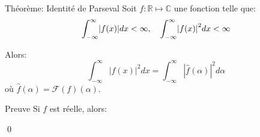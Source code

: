 \documentclass[a4paper]{article}
\begin{document}
\begin{parag}{Théorème: Identité de Parseval}
    Soit $f: \mathbb{R} \mapsto \mathbb{C}$ une fonction telle que: 
    \[\int_{-\infty}^{\infty} \left|f\left(x\right)\right|dx < \infty, \mathspace \int_{-\infty}^{\infty} \left|f\left(x\right)\right|^2 dx < \infty\]
    
    Alors: 
    \[\int_{-\infty}^{\infty} \left|f\left(x\right)\right|^2 dx = \int_{-\infty}^{\infty} \left|\hat{f}\left(\alpha\right)\right|^2 d \alpha\]
    où $\hat{f}\left(\alpha\right) = \mathcal{F}\left(f\right)\left(\alpha\right)$.
    
    \begin{subparag}{Preuve}
        Si $f$ est réelle, alors: 

        \qed
    \end{subparag}
\end{parag}
\end{document}
